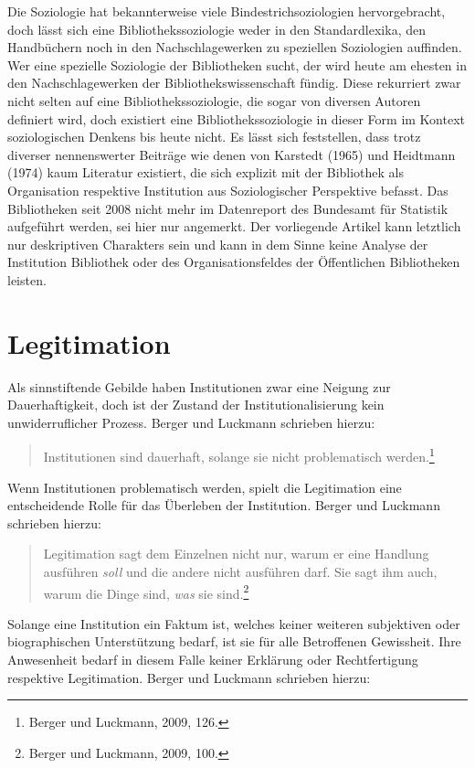 \documentclass[a4paper,
fontsize=11pt,
oneside,
numbers=noperiodatend,
parskip=half-,
bibliography=totoc,
final
]{scrartcl}
\begin{document}
Die Soziologie hat bekannterweise viele Bindestrichsoziologien
hervorgebracht, doch lässt sich eine Bibliothekssoziologie weder in den
Standardlexika, den Handbüchern noch in den Nachschlagewerken zu
speziellen Soziologien auffinden. Wer eine spezielle Soziologie der
Bibliotheken sucht, der wird heute am ehesten in den Nachschlagewerken
der Bibliothekswissenschaft fündig. Diese rekurriert zwar nicht selten
auf eine Bibliothekssoziologie, die sogar von diversen Autoren definiert
wird, doch existiert eine Bibliothekssoziologie in dieser Form im
Kontext soziologischen Denkens bis heute nicht. Es lässt sich
feststellen, dass trotz diverser nennenswerter Beiträge wie denen von
Karstedt (1965) und Heidtmann (1974) kaum Literatur existiert, die sich
explizit mit der Bibliothek als Organisation respektive Institution aus
Soziologischer Perspektive befasst. Das Bibliotheken seit 2008 nicht
mehr im Datenreport des Bundesamt für Statistik aufgeführt werden, sei
hier nur angemerkt. Der vorliegende Artikel kann letztlich nur
deskriptiven Charakters sein und kann in dem Sinne keine Analyse der
Institution Bibliothek oder des Organisationsfeldes der Öffentlichen
Bibliotheken leisten.

\section*{Legitimation}\label{legitimation}

Als sinnstiftende Gebilde haben Institutionen zwar eine Neigung zur
Dauerhaftigkeit, doch ist der Zustand der Institutionalisierung kein
unwiderruflicher Prozess. Berger und Luckmann schrieben hierzu:

\begin{quote}
Institutionen sind dauerhaft, solange sie nicht problematisch
werden.\footnote{Berger und Luckmann, 2009, 126.}
\end{quote}

Wenn Institutionen problematisch werden, spielt die Legitimation eine
entscheidende Rolle für das Überleben der Institution. Berger und
Luckmann schrieben hierzu:

\begin{quote}
Legitimation sagt dem Einzelnen nicht nur, warum er eine Handlung
ausführen \emph{soll} und die andere nicht ausführen darf. Sie sagt ihm
auch, warum die Dinge sind, \emph{was} sie sind.\footnote{Berger und
  Luckmann, 2009, 100.}
\end{quote}

Solange eine Institution ein Faktum ist, welches keiner weiteren
subjektiven oder biographischen Unterstützung bedarf, ist sie für alle
Betroffenen Gewissheit. Ihre Anwesenheit bedarf in diesem Falle keiner
Erklärung oder Rechtfertigung respektive Legitimation. Berger und
Luckmann schrieben hierzu:
\end{document}
